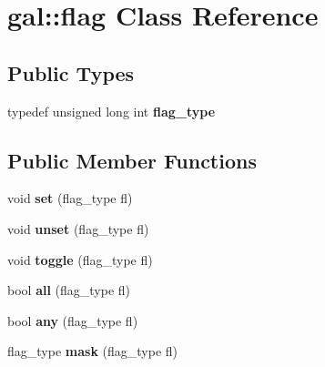 \hypertarget{classgal_1_1flag}{\section{gal\-:\-:flag \-Class \-Reference}
\label{classgal_1_1flag}
}
\subsection*{\-Public \-Types}
\begin{DoxyCompactItemize}
\item 
\hypertarget{classgal_1_1flag_a29c4c2b58d78fb8bc8e5f366d8f79c13}{typedef unsigned long int {\bfseries flag\-\_\-type}}\label{classgal_1_1flag_a29c4c2b58d78fb8bc8e5f366d8f79c13}

\end{DoxyCompactItemize}
\subsection*{\-Public \-Member \-Functions}
\begin{DoxyCompactItemize}
\item 
\hypertarget{classgal_1_1flag_a7d3d5509b05678517670ab344d5da626}{void {\bfseries set} (flag\-\_\-type fl)}\label{classgal_1_1flag_a7d3d5509b05678517670ab344d5da626}

\item 
\hypertarget{classgal_1_1flag_a367bae4fc3adab807aa7e6df1b20b517}{void {\bfseries unset} (flag\-\_\-type fl)}\label{classgal_1_1flag_a367bae4fc3adab807aa7e6df1b20b517}

\item 
\hypertarget{classgal_1_1flag_a8bffab2a607799d0c944f2caf594ee19}{void {\bfseries toggle} (flag\-\_\-type fl)}\label{classgal_1_1flag_a8bffab2a607799d0c944f2caf594ee19}

\item 
\hypertarget{classgal_1_1flag_a35c2d1efbc26977cc4f949ee447064ca}{bool {\bfseries all} (flag\-\_\-type fl)}\label{classgal_1_1flag_a35c2d1efbc26977cc4f949ee447064ca}

\item 
\hypertarget{classgal_1_1flag_af474ea5b722c2d853d4182e4b30b388f}{bool {\bfseries any} (flag\-\_\-type fl)}\label{classgal_1_1flag_af474ea5b722c2d853d4182e4b30b388f}

\item 
\hypertarget{classgal_1_1flag_ae7783c09ba627e5c78cb89b7b45e86d4}{flag\-\_\-type {\bfseries mask} (flag\-\_\-type fl)}\label{classgal_1_1flag_ae7783c09ba627e5c78cb89b7b45e86d4}

\end{DoxyCompactItemize}
